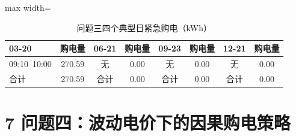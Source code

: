 \documentclass[UTF8,a4paper,zihao=-4,fontset=windows]{ctexart}
\begin{document}
\begin{table}[H]\centering\caption{问题三四个典型日紧急购电（kWh）}
\fontsize{9.5}{12}\selectfont\setlength{\tabcolsep}{4pt}\renewcommand{\arraystretch}{1.12}
\begin{adjustbox}{max width=\linewidth}\begin{tabular}{lccccccc}\toprule
03-20 & 购电量 & 06-21 & 购电量 & 09-23 & 购电量 & 12-21 & 购电量\\\midrule
09:10–10:00 & 270.59 & 无 & 0.00 & 无 & 0.00 & 无 & 0.00\\
合计 & 270.59 & 合计 & 0.00 & 合计 & 0.00 & 合计 & 0.00\\
\bottomrule\end{tabular}\end{adjustbox}\end{table}
\section{7 问题四：波动电价下的因果购电策略}
\end{document}
